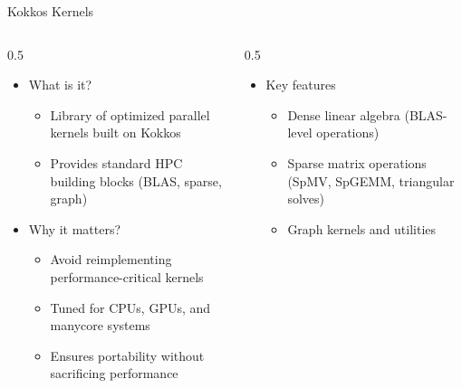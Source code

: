 \documentclass[
    aspectratio=169,
    \createHandout
]{beamer}
\begin{document}
\begin{frame}{Kokkos Kernels}
    \begin{columns}
        \begin{column}{0.5\linewidth}
            \begin{itemize}
                \item What is it?
                \begin{itemize}
                    \item Library of optimized parallel kernels built on Kokkos
                    \item Provides standard HPC building blocks (BLAS, sparse, graph)
                \end{itemize}
                \item Why it matters?
                \begin{itemize}
                    \item Avoid reimplementing performance-critical kernels
                    \item Tuned for CPUs, GPUs, and manycore systems
                    \item Ensures portability without sacrificing performance
                \end{itemize}
            \end{itemize}
        \end{column}
        \begin{column}{0.5\linewidth}
            \begin{itemize}
                \item Key features
                \begin{itemize}
                    \item Dense linear algebra (BLAS-level operations)
                    \item Sparse matrix operations (SpMV, SpGEMM, triangular solves)
                    \item Graph kernels and utilities
                \end{itemize}
            \end{itemize}
        \end{column}
    \end{columns}
\end{frame}
\end{document}
